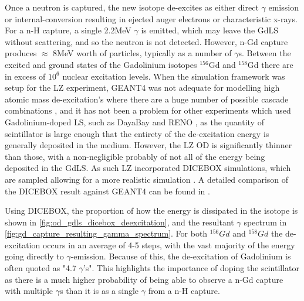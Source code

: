 \par
Once a neutron is captured, the new isotope de-excites as either direct $\gamma$ emission or internal-conversion resulting in ejected auger electrons or characteristic x-rays.
For a n-H capture, a single 2.2MeV $\gamma$ is emitted, which may leave the GdLS without scattering, and so the neutron is not detected.
However, n-Gd capture produces $\approx$ 8MeV worth of particles, typically as a number of $\gamma$s.
Between the excited and ground states of the Gadolinium isotopes ${}^{156}$Gd and ${}^{158}$Gd there are in excess of $10^{6}$ nuclear excitation levels.
When the simulation framework was setup for the LZ experiment, GEANT4 was not adequate for modelling high atomic mass de-excitation's where there are a huge number of possible cascade combinations \cite{ucsb_gdls_dicebox_simulations_ref}, and it has not been a problem for other experiments which used Gadolinium-doped LS, such as DayaBay \cite{dayabay_overview_ref} and RENO \cite{reno_overview_ref}, as the quantity of scintillator is large enough that the entirety of the de-excitation energy is generally deposited in the medium.
However, the LZ OD is significantly thinner than those, with a non-negligible probably of not all of the energy being deposited in the GdLS.
As such LZ incorporated DICEBOX \cite{dicebox_simulations_ref} simulations, which are sampled allowing for a more realistic simulation \cite{lz_simulations_ref}.
A detailed comparison of the DICEBOX result against GEANT4 can be found in \cite{ucsb_gdls_dicebox_simulations_ref}.


\par
Using DICEBOX, the proportion of how the energy is dissipated in the isotope is shown in \autoref{fig:od_gdls_dicebox_deexcitation}, and the resultant $\gamma$ spectrum in \autoref{fig:gd_capture_resulting_gamma_spectrum}.
For both ${}^{156}Gd$ and ${}^{158}Gd$ the de-excitation occurs in an average of 4-5 steps, with the vast majority of the energy going directly to $\gamma$-emission.
Because of this, the de-excitation of Gadolinium is often quoted as "4.7 $\gamma$'s".
This highlights the importance of doping the scintillator as there is a much higher probability of being able to observe a n-Gd capture with multiple $\gamma$s than it is as a single $\gamma$ from a n-H capture.



